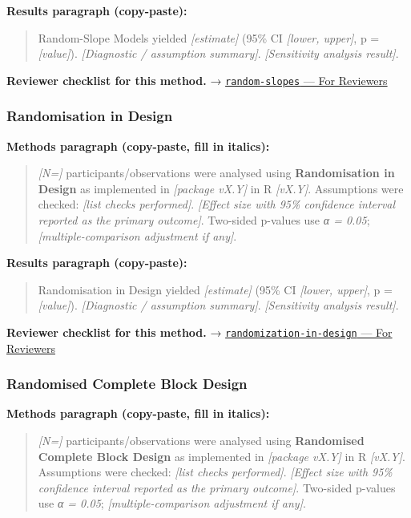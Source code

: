 \documentclass[
]{article}
\begin{document}
\textbf{Results paragraph (copy-paste):}

\begin{quote}
Random-Slope Models yielded \emph{{[}estimate{]}} (95\% CI
\emph{{[}lower, upper{]}}, p = \emph{{[}value{]}}). \emph{{[}Diagnostic
/ assumption summary{]}}. \emph{{[}Sensitivity analysis result{]}}.
\end{quote}

\textbf{Reviewer checklist for this method.} →
\href{../chapters/07-regression/random-slopes.Rmd\#for-reviewers}{\texttt{random-slopes}
--- For Reviewers}

\subsubsection{Randomisation in Design}\label{randomisation-in-design}

\textbf{Methods paragraph (copy-paste, fill in italics):}

\begin{quote}
\emph{{[}N={]}} participants/observations were analysed using
\textbf{Randomisation in Design} as implemented in \emph{{[}package
vX.Y{]}} in R \emph{{[}vX.Y{]}}. Assumptions were checked: \emph{{[}list
checks performed{]}}. \emph{{[}Effect size with 95\% confidence interval
reported as the primary outcome{]}}. Two-sided p-values use \emph{α =
0.05}; \emph{{[}multiple-comparison adjustment if any{]}}.
\end{quote}

\textbf{Results paragraph (copy-paste):}

\begin{quote}
Randomisation in Design yielded \emph{{[}estimate{]}} (95\% CI
\emph{{[}lower, upper{]}}, p = \emph{{[}value{]}}). \emph{{[}Diagnostic
/ assumption summary{]}}. \emph{{[}Sensitivity analysis result{]}}.
\end{quote}

\textbf{Reviewer checklist for this method.} →
\href{../chapters/16-design/randomization-in-design.Rmd\#for-reviewers}{\texttt{randomization-in-design}
--- For Reviewers}

\subsubsection{Randomised Complete Block
Design}\label{randomised-complete-block-design}

\textbf{Methods paragraph (copy-paste, fill in italics):}

\begin{quote}
\emph{{[}N={]}} participants/observations were analysed using
\textbf{Randomised Complete Block Design} as implemented in
\emph{{[}package vX.Y{]}} in R \emph{{[}vX.Y{]}}. Assumptions were
checked: \emph{{[}list checks performed{]}}. \emph{{[}Effect size with
95\% confidence interval reported as the primary outcome{]}}. Two-sided
p-values use \emph{α = 0.05}; \emph{{[}multiple-comparison adjustment if
any{]}}.
\end{quote}
\end{document}
